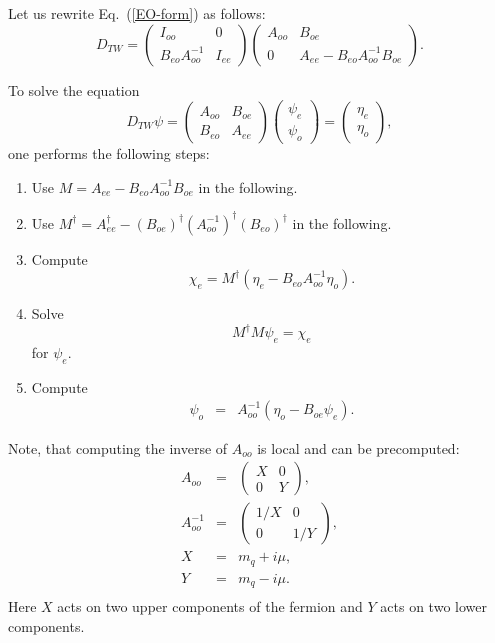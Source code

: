 \documentclass[twoside,openright,letterpaper]{article}
\begin{document}
Let us rewrite Eq.~(\ref{EO-form}) as follows:
\begin{equation}
D_{TW}=
\left(\begin{array}{cc}
I_{oo} & 0\\
B_{eo}A_{oo}^{-1} & I_{ee}
\end{array}\right)
\left(\begin{array}{cc}
A_{oo} & B_{oe}\\
0 & A_{ee}-B_{eo}A_{oo}^{-1}B_{oe}
\end{array}\right).
\end{equation}

To solve the equation
\[
D_{TW}\psi=
\left(\begin{array}{cc}
A_{oo} & B_{oe}\\
B_{eo} & A_{ee}
\end{array}\right)
\left(\begin{array}{c}\psi_e\\\psi_o\end{array}\right) =
   \left(\begin{array}{c}\eta_e\\\eta_o\end{array}\right),
\]
one performs the following steps:
\begin{enumerate}
\item Use $M=A_{ee}-B_{eo}A_{oo}^{-1}B_{oe}$ in the
following.
\item Use $M^\dagger=A_{ee}^\dagger-\left(B_{oe}\right)^\dagger
\left(A_{oo}^{-1}\right)^\dagger
\left(B_{eo}\right)^\dagger$ in the following.
\item Compute
\[
\chi_e =M^{\dagger} \left(\eta_e
            - B_{eo}A_{oo}^{-1}\eta_o\right).
\]
\item Solve
\begin{equation}
M^{\dagger}M\psi_e = \chi_e
\label{normal-eq}
\end{equation}
for $\psi_e$.
\item Compute
\begin{eqnarray}
\psi_o &=& A_{oo}^{-1}\left(\eta_o-B_{oe}\psi_e\right).
\end{eqnarray}
\end{enumerate}

Note, that computing the inverse of $A_{oo}$ is local and can be precomputed:
\begin{eqnarray*}
A_{oo}     &=& \left(\begin{array}{cc}X & 0 \\ 0 & Y\end{array}\right),\\
A_{oo}^{-1} &=& \left(\begin{array}{cc}1/X & 0 \\ 0 & 1/Y\end{array}\right),\\
X &=& m_q + i \mu, \\
Y &=& m_q - i \mu. \\
\end{eqnarray*}
Here $X$ acts on two upper components of the fermion and $Y$ acts on
two lower components.
\end{document}

